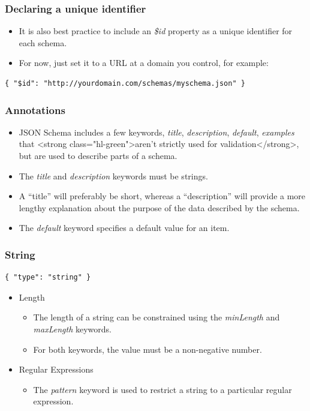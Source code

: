 \documentclass{efd-lecture}
\begin{document}
\begin{frame}[fragile]
  \frametitle{Declaring a unique identifier}
  \begin{itemize}
    \item It is also best practice to include an
      \textit{\color{YellowOrange} \$id} property as a unique identifier for
      each schema.
    \item For now, just set it to a URL at a domain you control, for example:
  \end{itemize}
  \begin{verbatim}
{ "$id": "http://yourdomain.com/schemas/myschema.json" }
  \end{verbatim}
\end{frame}

\begin{frame}
  \frametitle{Annotations}
  \begin{itemize}
    \item JSON Schema includes a few keywords,
      \textit{\color{YellowOrange}title},
      \textit{\color{YellowOrange}description},
      \textit{\color{YellowOrange}default},
      \textit{\color{YellowOrange}examples} that
        <strong class="hl-green">aren’t strictly used for validation</strong>,
        but are used to describe parts of a schema.
    \item The \textit{\color{Yellow}title} and
      \textit{\color{Yellow}description} keywords must be strings.
    \item A ``title'' will preferably be short, whereas a ``description'' will provide
      a more lengthy explanation about the purpose of the data described by
      the schema.
    \item The \textit{\color{Cyan}default} keyword specifies a default
      value for an item.
  \end{itemize}
\end{frame}

\begin{frame}[fragile]
  \frametitle{String}
  \begin{verbatim}
{ "type": "string" }
  \end{verbatim}
  \begin{itemize}
    \item Length
    \begin{itemize}
      \item
        The length of a string can be constrained using the
        \textit{\color{LimeGreen}minLength} and
        \textit{\color{YellowOrange}maxLength} keywords.
      \item For both keywords, the value must be a non-negative number.
    \end{itemize}
    \item Regular Expressions
    \begin{itemize}
      \item The \textit{\color{YellowOrange}pattern} keyword is used to restrict
        a string to a particular regular expression.
    \end{itemize}
  \end{itemize}
\end{frame}
\end{document}
